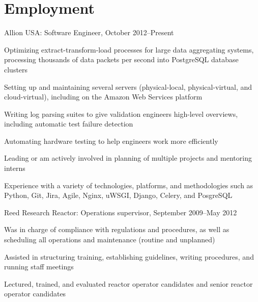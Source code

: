 \documentclass[letterpaper]{article}
\renewenvironment{itemize}{\begin{list}{}{\setlength{\leftmargin}{1.5em}}}{\end{list}}%
\begin{document}
\section*{Employment}%

\begin{itemize}
\item Allion USA: Software Engineer, October 2012--Present
	\begin{itemize}
    \item Optimizing extract-transform-load processes for large data aggregating systems, processing thousands of data packets per second into PostgreSQL database clusters
    \item Setting up and maintaining several servers (physical-local, physical-virtual, and cloud-virtual), including on the Amazon Web Services platform%
    \item Writing log parsing suites to give validation engineers high-level overviews, including automatic test failure detection
    \item Automating hardware testing to help engineers work more efficiently 
    \item Leading or am actively involved in planning of multiple projects and mentoring interns
    \item Experience with a variety of technologies, platforms, and methodologies such as Python, Git, Jira, Agile, Nginx, uWSGI, Django, Celery, and PosgreSQL 
	\end{itemize}
\item Reed Research Reactor: Operations supervisor, September 2009--May 2012
	\begin{itemize}
	\item Was in charge of compliance with regulations and procedures, as well as scheduling all operations and maintenance (routine and unplanned)
	\item Assisted in structuring training, establishing guidelines, writing procedures, and running staff meetings
	\item Lectured, trained, and evaluated reactor operator candidates and senior reactor operator candidates

\end{itemize}
\end{itemize}
\end{document}
